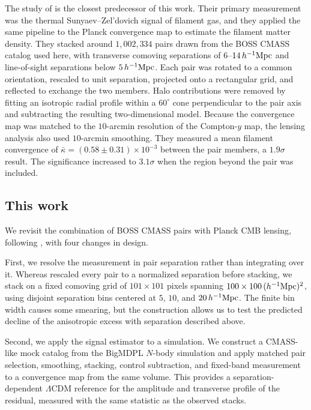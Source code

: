 \documentclass[preprint]{aastex701}
\newcommand{\hinvMpc}{h^{-1}{\rm Mpc}}
\begin{document}
The study of \citet{deGraaff2019} is the closest predecessor of this work.
Their primary measurement was the thermal Sunyaev--Zel'dovich signal of
filament gas, and they applied the same pipeline to the Planck convergence
map to estimate the filament matter density. They stacked around
$1{,}002{,}334$ pairs
drawn from the BOSS CMASS catalog used here, with transverse comoving
separations of $6$--$14\,\hinvMpc$ and line-of-sight separations below
$5\,\hinvMpc$. Each pair was rotated to a common orientation, rescaled to unit
separation, projected onto a rectangular grid, and reflected to exchange the
two members. Halo contributions were removed by fitting an isotropic radial
profile within a $60^{\circ}$ cone perpendicular to the pair axis and
subtracting the resulting two-dimensional model. Because the convergence map
was matched to the $10$-arcmin resolution of the Compton-$y$ map, the
lensing analysis also used $10$-arcmin smoothing. They measured a mean
filament convergence of
$\bar{\kappa}=(0.58\pm0.31)\times10^{-3}$ between the pair members, a
$1.9\sigma$ result. The significance increased to $3.1\sigma$ when the region
beyond the pair was included.

\subsection{This work}

We revisit the combination of BOSS CMASS pairs with Planck CMB lensing,
following \citet{deGraaff2019}, with four changes in design.

First, we resolve the measurement in pair separation rather than integrating
over it. Whereas \citet{deGraaff2019} rescaled every pair to a normalized
separation before stacking, we stack on a fixed comoving grid of
$101\times101$ pixels spanning $100\times100\,(\hinvMpc)^{2}$, using disjoint
separation bins centered at $5$, $10$, and $20\,\hinvMpc$. The finite bin
width causes some smearing, but the construction allows us to test
the predicted decline of the anisotropic excess with separation described
above.

Second, we apply the signal estimator to a simulation. We construct a
CMASS-like mock catalog from the BigMDPL $N$-body simulation
\citep{Klypin2016} and apply matched pair selection, smoothing, stacking,
control subtraction, and fixed-band measurement to a convergence map from the
same volume. This provides a separation-dependent $\Lambda$CDM reference for
the amplitude and transverse profile of the residual, measured with the same
statistic as the observed stacks.
\end{document}

